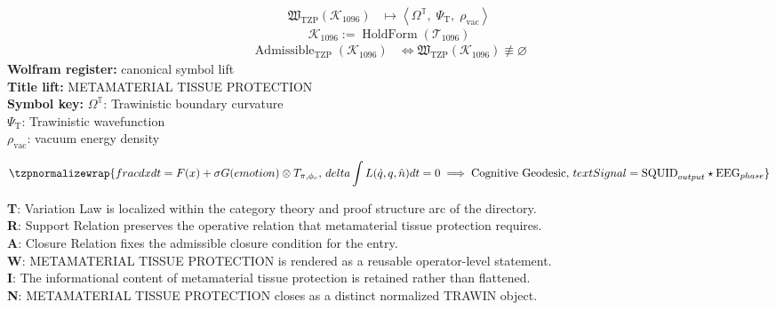 \noindent
\begin{minipage}[t]{0.48\linewidth}
\begingroup
\small
\[
\begin{aligned}
\mathfrak{W}_{\mathrm{TZP}}\!\left(\mathcal{K}_{1096}\right)
&\longmapsto
\left\langle \Omega^{\mathbb{T}},\; \Psi_{\mathrm{T}},\; \rho_{\mathrm{vac}} \right\rangle
\end{aligned}
\]
\[
\mathcal{K}_{1096}
:=
\operatorname{HoldForm}\!\left(\mathcal{T}_{1096}\right)
\]
\[
\begin{aligned}
\operatorname{Admissible}_{\mathrm{TZP}}\!\left(\mathcal{K}_{1096}\right)
&\Longleftrightarrow
\mathfrak{W}_{\mathrm{TZP}}\!\left(\mathcal{K}_{1096}\right)\not\equiv\varnothing
\end{aligned}
\]
\textbf{Wolfram register:} canonical symbol lift\\
\textbf{Title lift:} METAMATERIAL TISSUE PROTECTION\\
\textbf{Symbol key:} \(\Omega^{\mathbb{T}}\): Trawinistic boundary curvature\\ \(\Psi_{\mathrm{T}}\): Trawinistic wavefunction\\ \(\rho_{\mathrm{vac}}\): vacuum energy density
\par
\endgroup
\end{minipage}\hfill
\begin{minipage}[t]{0.48\linewidth}
\[
\tzpnormalizewrap{frac{dx}{dt} = F(x) + \sigma G(emotion) \otimes T_{\pi,\phi_c},\,delta \int L(\dot{q}, q, \hat{n}) dt = 0 \implies \text{Cognitive Geodesic},\,text{Signal} = \text{SQUID}_{output} \star \text{EEG}_{phase}}
\]

\small
\textbf{T}: Variation Law is localized within the category theory and proof structure arc of the directory.\\
\textbf{R}: Support Relation preserves the operative relation that metamaterial tissue protection requires.\\
\textbf{A}: Closure Relation fixes the admissible closure condition for the entry.\\
\textbf{W}: METAMATERIAL TISSUE PROTECTION is rendered as a reusable operator-level statement.\\
\textbf{I}: The informational content of metamaterial tissue protection is retained rather than flattened.\\
\textbf{N}: METAMATERIAL TISSUE PROTECTION closes as a distinct normalized TRAWIN object.
\normalsize
\end{minipage}

